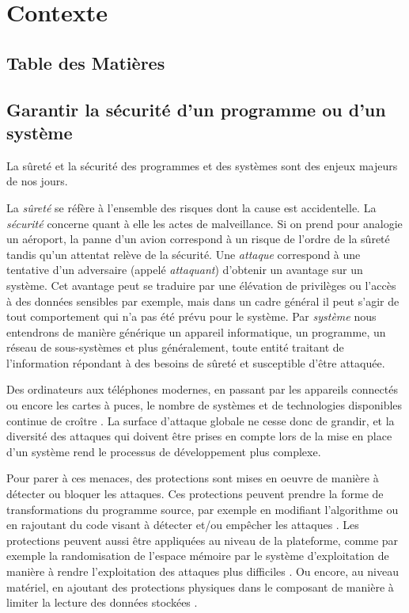 \chapter{Contexte}
\label{chpt:contexte}
    
    \section*{Table des Matières}
    \localtableofcontents
    
    \section{Garantir la sécurité d'un programme ou d'un système}
    
        La sûreté et la sécurité des programmes et des systèmes sont des enjeux majeurs de nos jours. 
        
        La \textit{sûreté} se réfère à l'ensemble des risques dont la cause est accidentelle. La \textit{sécurité} concerne quant à elle les actes de malveillance.
        Si on prend pour analogie un aéroport, la panne d'un avion correspond à un risque de l'ordre de la sûreté tandis qu'un attentat relève de la sécurité.
        Une \textit{attaque} correspond à une tentative d'un adversaire (appelé \textit{attaquant}) d'obtenir un avantage sur un système. 
        Cet avantage peut se traduire par une élévation de privilèges \cite{Timmers/FDTC16} ou l'accès à des données sensibles \cite{Biham/AICC97} par exemple, mais dans un cadre général il peut s'agir de tout comportement qui n'a pas été prévu pour le système. 
        Par \textit{système} nous entendrons de manière générique un appareil informatique, un programme, un réseau de sous-systèmes et plus généralement, toute entité traitant de l'information répondant à des besoins de sûreté et susceptible d'être attaquée.
        
        Des ordinateurs aux téléphones modernes, en passant par les appareils connectés ou encore les cartes à puces, le nombre de systèmes et de technologies disponibles continue de croître \cite{HardwareEmbeddedSystems}. La surface d'attaque globale ne cesse donc de grandir, et la diversité des attaques qui doivent être prises en compte lors de la mise en place d'un système rend le processus de développement plus complexe. 
        
        Pour parer à ces menaces, des protections sont mises en oeuvre de manière à détecter ou bloquer les attaques. Ces protections peuvent prendre la forme de transformations du programme source, par exemple en modifiant l'algorithme \cite{Aumuller/CHES02} ou en rajoutant du code visant à détecter et/ou empêcher les attaques  \cite{Reis/ISCCO05, lalande}. Les protections peuvent aussi être appliquées au niveau de la plateforme, comme par exemple la randomisation de l'espace mémoire par le système d'exploitation de manière à rendre l'exploitation des attaques plus difficiles \cite{shacham2004effectiveness}. Ou encore, au niveau matériel, en ajoutant des protections physiques dans le composant de manière à limiter la lecture des données stockées \cite{Boneh/EUROCRYPT97}.
        
